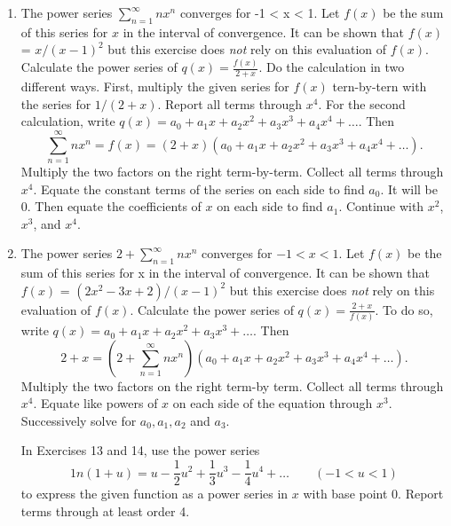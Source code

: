 \documentclass{article}
\begin{document}
\begin{enumerate}
    \item The power series $\sum_{n=1}^\infty nx^n$ converges for -1 < x < 1. Let $f(x)$ be the sum of this series for $x$ in the interval of convergence. It can be shown that $f(x)$ = $x/(x-1)^2$ but this exercise does \emph{not} rely on this evaluation of $f(x)$. Calculate the power series of $q(x)=\frac{f(x)}{2+x}.$ Do the calculation in two different ways. First, multiply the given series for $f(x)$ tern-by-tern with the series for $1/(2+x).$ Report all terms through $x^4.$ For the second calculation, write $q(x)=a_0+a_1x+a_2x^2+a_3x^3+a_4x^4+\dots.$ Then
    $$\sum_{n=1}^\infty nx^n=f(x)=(2+x)(a_0+a_1x+a_2x^2+a_3x^3+a_4x^4+\dots).$$
    Multiply the two factors on the right term-by-term. Collect all terms through $x^4.$ Equate the constant terms of the series on each side to find $a_0$. It will be 0. Then equate the coefficients of $x$ on each side to find $a_1.$ Continue with $x^2$, $x^3$, and $x^4.$

    \item The power series $2+\sum_{n=1}^\infty nx^n$ converges for $-1 < x < 1.$ Let $f(x)$ be the sum of this series for x in the interval of convergence. It can be shown that $f(x)$ = $\left(2x^2-3x+2\right)/(x-1)^2$ but this exercise does \emph{not} rely on this evaluation of $f(x)$. Calculate the power series of $q(x)=\frac{2+x}{f(x)}.$ To do so, write $q(x)=a_0+a_1x+a_2x^2+a_3x^3+\dots.$ Then
    $$2+x=\left(2+\sum_{n=1}^\infty nx^n\right)(a_0+a_1x+a_2x^2+a_3x^3+a_4x^4+\dots).$$
    Multiply the two factors on the right term-by term. Collect all terms through $x^4$. Equate like powers of $x$ on each side of the equation through $x^3.$ Successively solve for $a_0,a_1,a_2$ and $a_3.$ \vspace{2em}

    In Exercises 13 and 14, use the power series
    $$1n(1+u)=u-\frac{1}{2}u^2+\frac{1}{3}u^3-\frac{1}{4}u^4+\dots\hspace{2em}(-1<u<1)$$
    to express the given function as a power series in $x$ with base point 0. Report terms through at least order 4.
\end{enumerate}
\end{document}
